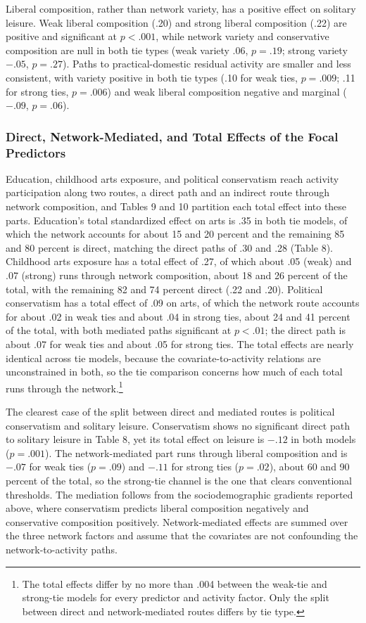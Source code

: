 \documentclass[
  12pt
]{article}
\begin{document}
Liberal composition, rather than network variety, has a positive effect on solitary leisure. Weak liberal composition (.20) and strong liberal composition (.22) are positive and significant at $p < .001$, while network variety and conservative composition are null in both tie types (weak variety .06, $p = .19$; strong variety $-.05$, $p = .27$). Paths to practical-domestic residual activity are smaller and less consistent, with variety positive in both tie types (.10 for weak ties, $p = .009$; .11 for strong ties, $p = .006$) and weak liberal composition negative and marginal ($-.09$, $p = .06$).

\subsubsection{Direct, Network-Mediated, and Total Effects of the Focal Predictors}\label{direct-network-mediated-and-total-effects-of-the-focal-predictors}

Education, childhood arts exposure, and political conservatism reach activity participation along two routes, a direct path and an indirect route through network composition, and Tables 9 and 10 partition each total effect into these parts. Education's total standardized effect on arts is .35 in both tie models, of which the network accounts for about 15 and 20 percent and the remaining 85 and 80 percent is direct, matching the direct paths of .30 and .28 (Table 8). Childhood arts exposure has a total effect of .27, of which about .05 (weak) and .07 (strong) runs through network composition, about 18 and 26 percent of the total, with the remaining 82 and 74 percent direct (.22 and .20). Political conservatism has a total effect of .09 on arts, of which the network route accounts for about .02 in weak ties and about .04 in strong ties, about 24 and 41 percent of the total, with both mediated paths significant at $p < .01$; the direct path is about .07 for weak ties and about .05 for strong ties. The total effects are nearly identical across tie models, because the covariate-to-activity relations are unconstrained in both, so the tie comparison concerns how much of each total runs through the network.\footnote{The total effects differ by no more than .004 between the weak-tie and strong-tie models for every predictor and activity factor. Only the split between direct and network-mediated routes differs by tie type.}

The clearest case of the split between direct and mediated routes is political conservatism and solitary leisure. Conservatism shows no significant direct path to solitary leisure in Table 8, yet its total effect on leisure is $-.12$ in both models ($p = .001$). The network-mediated part runs through liberal composition and is $-.07$ for weak ties ($p = .09$) and $-.11$ for strong ties ($p = .02$), about 60 and 90 percent of the total, so the strong-tie channel is the one that clears conventional thresholds. The mediation follows from the sociodemographic gradients reported above, where conservatism predicts liberal composition negatively and conservative composition positively. Network-mediated effects are summed over the three network factors and assume that the covariates are not confounding the network-to-activity paths.
\end{document}
